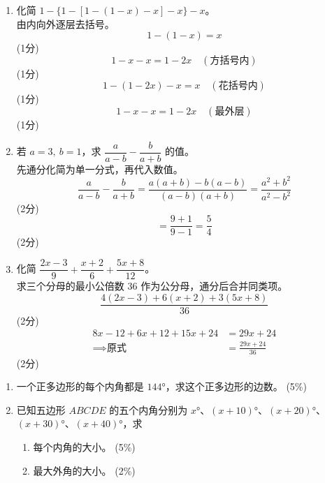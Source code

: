\documentclass[12pt,a4paper]{exam-zh}
\begin{document}
\begin{solution}
    \begin{enumerate}[label=(\alph*)]
        \item 化简 $1-\{1-[1-(1-x)-x]-x\}-x$。 \\
        由内向外逐层去括号。
        \[
            1-(1-x) = x
        \]
        \hfill (1分)
        \[
            1-x-x = 1-2x \quad (\text{方括号内})
        \]
        \hfill (1分)
        \[
            1-(1-2x)-x = x \quad (\text{花括号内})
        \]
        \hfill (1分)
        \[
            1-x-x = 1-2x \quad (\text{最外层})
        \]
        \hfill (1分)

        \item 若 $a=3,\ b=1$，求 $\dfrac{a}{a-b}-\dfrac{b}{a+b}$ 的值。 \\
        先通分化简为单一分式，再代入数值。
        \[
            \frac{a}{a-b}-\frac{b}{a+b} = \frac{a(a+b)-b(a-b)}{(a-b)(a+b)} = \frac{a^2+b^2}{a^2-b^2}
        \]
        \hfill (2分)
        \[
            = \frac{9+1}{9-1} = \frac{5}{4}
        \]
        \hfill (2分)

        \item 化简 $\dfrac{2x-3}{9}+\dfrac{x+2}{6}+\dfrac{5x+8}{12}$。 \\
        求三个分母的最小公倍数 $36$ 作为公分母，通分后合并同类项。
        \[
            \frac{4(2x-3)+6(x+2)+3(5x+8)}{36}
        \]
        \hfill (2分)
        \begin{align*}
            8x-12+6x+12+15x+24 &= 29x+24 \\
            \implies \text{原式} &= \frac{29x+24}{36}
        \end{align*}
        \hfill (2分)
    \end{enumerate}
\end{solution}


\begin{question}[points = 18]
    \begin{enumerate}[label=(\alph*)]
        \item 一个正多边形的每个内角都是 $144°$，求这个正多边形的边数。 \hfill (5\%)
        \item 已知五边形 $ABCDE$ 的五个内角分别为 $x°$、$(x+10)°$、$(x+20)°$、$(x+30)°$、$(x+40)°$，求
        \begin{enumerate}[label=(\roman*)]
            \item 每个内角的大小。 \hfill (5\%)
            \item 最大外角的大小。 \hfill (2\%)
        \end{enumerate}
    \end{enumerate}
\end{question}
\end{document}
